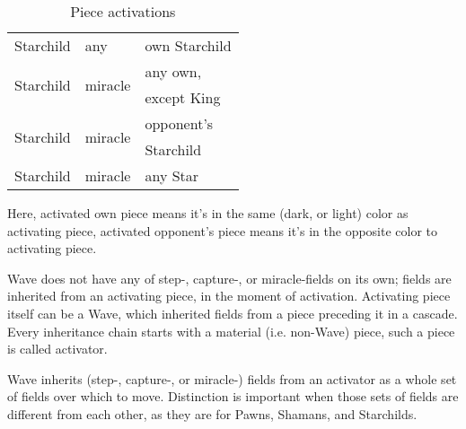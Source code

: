 \begin{table}[!h]
\begin{tabular}{ lll }
\cmidrule{1-3} %
Starchild                               & any                           & own Starchild                 \\
\cmidrule{1-3} %
\multirow{2}{*}{Starchild}              & \multirow{2}{*}{miracle}      & any own,                      \\
                                        &                               & except King                   \\
\cmidrule{1-3} %
\multirow{2}{*}{Starchild}              & \multirow{2}{*}{miracle}      & opponent's                    \\
                                        &                               & Starchild                     \\
\cmidrule{1-3} %
Starchild                               & miracle                       & any Star                      \\
\bottomrule %
\end{tabular}
\caption{Piece activations}
\label{tbl:Appendix/Summary/Piece activations}
\end{table}


Here, activated own piece means it's in the same (dark, or light) color as
activating piece, activated opponent's piece means it's in the opposite color
to activating piece.

Wave does not have any of step-, capture-, or miracle-fields on its own; fields
are inherited from an activating piece, in the moment of activation. Activating
piece itself can be a Wave, which inherited fields from a piece preceding it in
a cascade. Every inheritance chain starts with a material (i.e. non-Wave) piece,
such a piece is called activator.

Wave inherits (step-, capture-, or miracle-) fields from an activator as a whole
set of fields over which to move. Distinction is important when those sets of
fields are different from each other, as they are for Pawns, Shamans, and
Starchilds.

